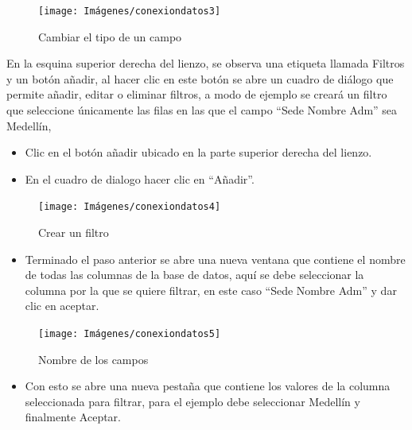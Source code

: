 \documentclass[
]{book}
\providecommand{\tightlist}{%
  \setlength{\itemsep}{0pt}\setlength{\parskip}{0pt}}
\begin{document}
\begin{figure}

{\centering \texttt{[image: Imágenes/conexiondatos3]} 

}

\caption{Cambiar el tipo de un campo}\label{fig:cambiartipocampo-fig}
\end{figure}

En la esquina superior derecha del lienzo, se observa una etiqueta llamada Filtros y un botón añadir, al hacer clic en este botón se abre un cuadro de diálogo que permite añadir, editar o eliminar filtros, a modo de ejemplo se creará un filtro que seleccione únicamente las filas en las que el campo ``Sede Nombre Adm'' sea Medellín,

\begin{itemize}
\item
  Clic en el botón añadir ubicado en la parte superior derecha del lienzo.
\item
  En el cuadro de dialogo hacer clic en ``Añadir''.
\end{itemize}

\begin{figure}

{\centering \texttt{[image: Imágenes/conexiondatos4]} 

}

\caption{Crear un filtro}\label{fig:crearfiltro-fig}
\end{figure}

\begin{itemize}
\tightlist
\item
  Terminado el paso anterior se abre una nueva ventana que contiene el nombre de todas las columnas de la base de datos, aquí se debe seleccionar la columna por la que se quiere filtrar, en este caso ``Sede Nombre Adm'' y dar clic en aceptar.
\end{itemize}

\begin{figure}

{\centering \texttt{[image: Imágenes/conexiondatos5]} 

}

\caption{Nombre de los campos}\label{fig:nombrecamposfiltro-fig}
\end{figure}

\begin{itemize}
\tightlist
\item
  Con esto se abre una nueva pestaña que contiene los valores de la columna seleccionada para filtrar, para el ejemplo debe seleccionar Medellín y finalmente Aceptar.
\end{itemize}
\end{document}
